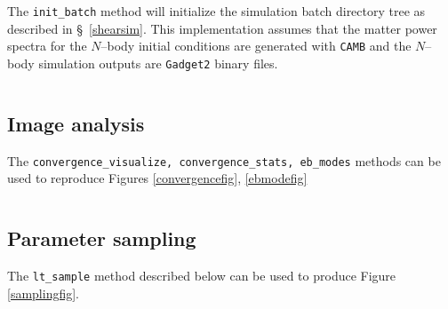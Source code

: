 \documentclass[reprint,aps,prd,superscriptaddress,showkeys,showpacs]{revtex4-1}
\newcommand{\ttt}[1]{\texttt{#1}}
\begin{document}
The \ttt{init\_batch} method will initialize the simulation batch directory tree as described in \S~\ref{shearsim}. This implementation assumes that the matter power spectra for the $N$--body initial conditions are generated with \ttt{CAMB} and the $N$--body simulation outputs are \ttt{Gadget2} binary files.  
\begin{widetext}
\inputminted[linenos]{python}{Snippets/dirtree.py}
\end{widetext}

\subsection{Image analysis}
The \ttt{convergence\_visualize, convergence\_stats, eb\_modes} methods can be used to reproduce Figures \ref{convergencefig}, \ref{ebmodefig}
\begin{widetext}
\inputminted[linenos]{python}{Snippets/image.py}
\end{widetext}

\subsection{Parameter sampling}

The \ttt{lt\_sample} method described below can be used to produce Figure \ref{samplingfig}. 
\begin{widetext}
\inputminted[linenos]{python}{Snippets/sampling.py}
\end{widetext}

\label{lastpage}
\end{document}

